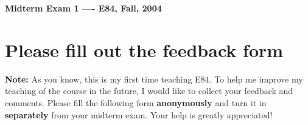 \usepackage{html}

\begin{center}
{\Large \bf  Midterm Exam 1 ---- E84, Fall, 2004}
\end{center}

\section*{Please fill out the feedback form}

{\bf Note: } As you know, this is my first time teaching E84. To help me
improve my teaching of the course in the future, I would like to collect 
your feedback and comments. Please fill the following form {\bf anonymously}
and turn it in {\bf separately} from your midterm exam. Your help is greatly
appreciated!

